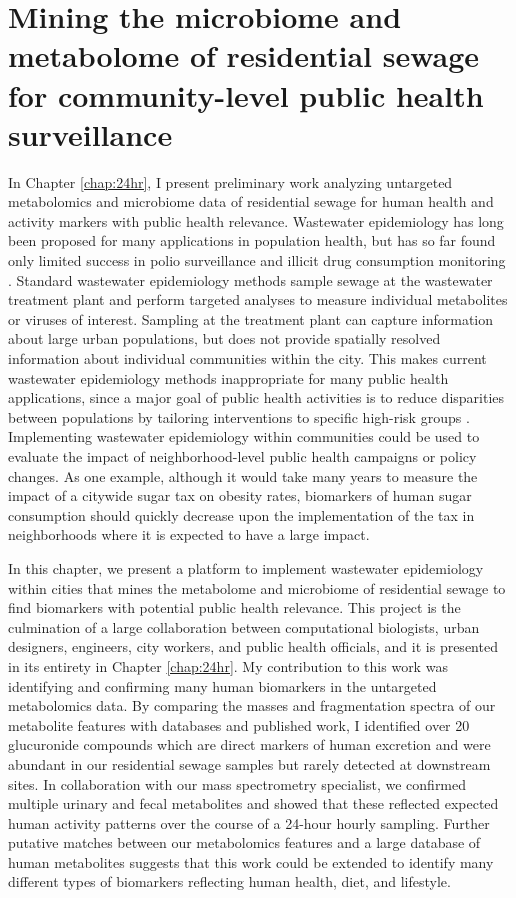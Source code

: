 \section{Mining the microbiome and metabolome of residential sewage for community-level public health surveillance}

In Chapter \ref{chap:24hr}, I present preliminary work analyzing untargeted metabolomics and microbiome data of residential sewage for human health and activity markers with public health relevance.
Wastewater epidemiology has long been proposed for many applications in population health, but has so far found only limited success in polio surveillance \cite{polio} and illicit drug consumption monitoring \cite{Subedi2014,Ort2014}.
Standard wastewater epidemiology methods sample sewage at the wastewater treatment plant and perform targeted analyses to measure individual metabolites or viruses of interest.
Sampling at the treatment plant can capture information about large urban populations, but does not provide spatially resolved information about individual communities within the city.
This makes current wastewater epidemiology methods inappropriate for many public health applications, since a major goal of public health activities is to reduce disparities between populations by tailoring interventions to specific high-risk groups \cite{Ramaswami2018,Weeramanthri2018,Khoury2016}.
Implementing wastewater epidemiology within communities could be used to evaluate the impact of neighborhood-level public health campaigns or policy changes.
As one example, although it would take many years to measure the impact of a citywide sugar tax on obesity rates, biomarkers of human sugar consumption should quickly decrease upon the implementation of the tax in neighborhoods where it is expected to have a large impact.

In this chapter, we present a platform to implement wastewater epidemiology within cities that mines the metabolome and microbiome of residential sewage to find biomarkers with potential public health relevance.
This project is the culmination of a large collaboration between computational biologists, urban designers, engineers, city workers, and public health officials, and it is presented in its entirety in Chapter \ref{chap:24hr}.
My contribution to this work was identifying and confirming many human biomarkers in the untargeted metabolomics data.
By comparing the masses and fragmentation spectra of our metabolite features with databases and published work, I identified over 20 glucuronide compounds which are direct markers of human excretion and were abundant in our residential sewage samples but rarely detected at downstream sites.
In collaboration with our mass spectrometry specialist, we confirmed multiple urinary and fecal metabolites and showed that these reflected expected human activity patterns over the course of a 24-hour hourly sampling.
Further putative matches between our metabolomics features and a large database of human metabolites \cite{hmdb} suggests that this work could be extended to identify many different types of biomarkers reflecting human health, diet, and lifestyle.

\begin{singlespace}


\end{singlespace}
